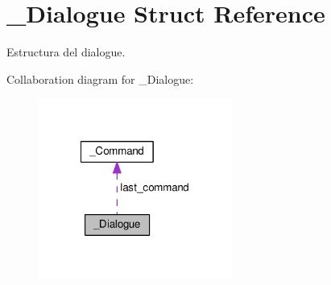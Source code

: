 \hypertarget{struct__Dialogue}{\section{\+\_\+\+Dialogue Struct Reference}
\label{struct__Dialogue}
}


Estructura del dialogue.  




Collaboration diagram for \+\_\+\+Dialogue\+:
\nopagebreak
\begin{figure}[H]
\begin{center}
\leavevmode
\includegraphics[width=180pt]{struct__Dialogue__coll__graph}
\end{center}
\end{figure}
